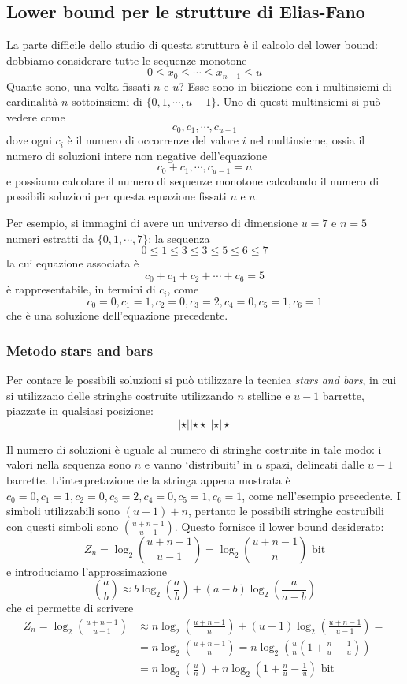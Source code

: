 \subsection{Lower bound per le strutture di Elias-Fano}
La parte difficile dello studio di questa struttura è il calcolo del lower bound:
dobbiamo considerare tutte le sequenze monotone
$$
	0 \leq x_0 \leq \cdots \leq x_{n-1} \le u
$$
Quante sono, una volta fissati $n$ e $u$? Esse sono in biiezione con i multinsiemi di cardinalità
$n$ sottoinsiemi di $\{0,1, \cdots, u-1\}$. Uno di questi multinsiemi si può vedere come
$$
	c_0, c_1, \cdots, c_{u-1}
$$
dove ogni $c_i$ è il numero di occorrenze del valore $i$ nel multinsieme, ossia
il numero di soluzioni intere non negative dell'equazione
$$
	c_0 + c_1, \cdots, c_{u-1} = n
$$
e possiamo calcolare il numero di sequenze monotone calcolando il numero
di possibili soluzioni per questa equazione fissati $n$ e $u$.

Per esempio, si immagini di avere un universo di dimensione $u = 7$ e $n = 5$ numeri
estratti da $\{0, 1, \cdots, 7\}$: la sequenza
$$
	0 \leq 1 \leq 3 \leq 3 \leq 5 \leq 6 \le 7
$$
la cui equazione associata è
$$
	c_0 + c_1 + c_2 + \cdots + c_6 = 5
$$
è rappresentabile, in termini di $c_i$, come
$$
	c_0 = 0, c_1 = 1, c_2 = 0, c_3 = 2, c_4 = 0, c_5 = 1, c_6 = 1
$$
che è una soluzione dell'equazione precedente.

\subsubsection{Metodo stars and bars}
Per contare le possibili soluzioni si può utilizzare la tecnica \textit{stars and bars}, in
cui si utilizzano delle stringhe costruite utilizzando $n$ stelline e $u-1$ barrette, piazzate
in qualsiasi posizione:
$$
	| \star || \star \star || \star | \star
$$

Il numero di soluzioni è uguale al numero di stringhe costruite in tale modo: i valori nella sequenza
sono $n$ e vanno `distribuiti' in $u$ spazi, delineati dalle $u-1$ barrette. L'interpretazione della
stringa appena mostrata è $ c_0 = 0, c_1 = 1, c_2 = 0, c_3 = 2, c_4 = 0, c_5 = 1, c_6 = 1 $, come
nell'esempio precedente. I simboli utilizzabili sono $(u-1) + n$, pertanto le possibili stringhe
costruibili con questi simboli sono  ${u + n -1}\choose{u - 1}$.
Questo fornisce il lower bound desiderato:
$$
	Z_n = \log_2{{u + n -1}\choose{u - 1}} = \log_2{{u + n - 1}\choose{n}} \text{ bit}
$$
e introduciamo l'approssimazione
$$
	{{a}\choose{b}} \approx b \log_2(\frac{a}{b}) + (a - b)\log_2(\frac{a}{a-b})
$$
che ci permette di scrivere
\begin{align*}
	Z_n = \log_2{{u + n -1}\choose{u - 1}} & \approx n \log_2(\frac{u + n -1}{n}) + (u -1) \log_2(\frac{u + n - 1}{u - 1}) =        \\
	                                       & = n \log_2(\frac{u + n - 1}{n}) = n \log_2(\frac{u}{n}(1 + \frac{n}{u} - \frac{1}{u})) \\
	                                       & = n \log_2(\frac{u}{n}) + n \log_2(1 + \frac{n}{u} - \frac{1}{u}) \text{ bit}
\end{align*}

